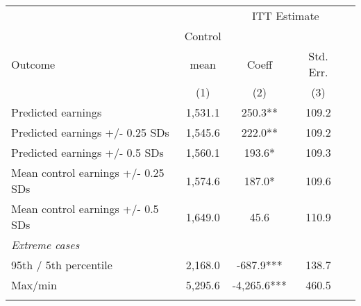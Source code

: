 \begin{tabular}{lcccc}
\hline \noalign{\smallskip} &  & \multicolumn{2}{c}{{ ITT Estimate}} & \\
\cline{3-4} & Control &  &  & \\
Outcome & mean & Coeff & Std. Err. & \\
 & (1) & (2) & (3) & \\
\noalign{\smallskip}\hline \noalign{\smallskip}Predicted earnings & 1,531.1 & 250.3** & 109.2 & \\
Predicted earnings +/- 0.25 SDs & 1,545.6 & 222.0** & 109.2 & \\
Predicted earnings +/- 0.5 SDs & 1,560.1 & 193.6* & 109.3 & \\
Mean control earnings +/- 0.25 SDs & 1,574.6 & 187.0* & 109.6 & \\
Mean control earnings +/- 0.5 SDs & 1,649.0 & 45.6 & 110.9 & \\
\hline 
\emph{Extreme cases}  & &  & & \\
95th / 5th percentile & 2,168.0 & -687.9*** & 138.7 & \\
Max/min & 5,295.6 & -4,265.6*** & 460.5 & \\
\noalign{\smallskip}\hline\end{tabular}\\
